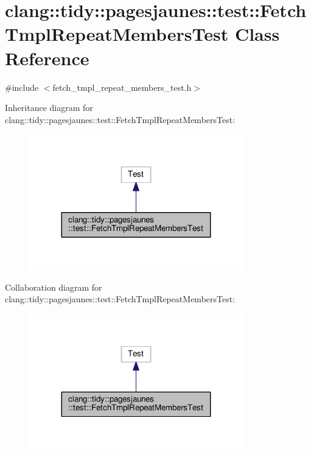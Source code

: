 \hypertarget{classclang_1_1tidy_1_1pagesjaunes_1_1test_1_1_fetch_tmpl_repeat_members_test}{}\section{clang\+:\+:tidy\+:\+:pagesjaunes\+:\+:test\+:\+:Fetch\+Tmpl\+Repeat\+Members\+Test Class Reference}
\label{classclang_1_1tidy_1_1pagesjaunes_1_1test_1_1_fetch_tmpl_repeat_members_test}


{\ttfamily \#include $<$fetch\+\_\+tmpl\+\_\+repeat\+\_\+members\+\_\+test.\+h$>$}



Inheritance diagram for clang\+:\+:tidy\+:\+:pagesjaunes\+:\+:test\+:\+:Fetch\+Tmpl\+Repeat\+Members\+Test\+:
\nopagebreak
\begin{figure}[H]
\begin{center}
\leavevmode
\includegraphics[width=263pt]{classclang_1_1tidy_1_1pagesjaunes_1_1test_1_1_fetch_tmpl_repeat_members_test__inherit__graph}
\end{center}
\end{figure}


Collaboration diagram for clang\+:\+:tidy\+:\+:pagesjaunes\+:\+:test\+:\+:Fetch\+Tmpl\+Repeat\+Members\+Test\+:
\nopagebreak
\begin{figure}[H]
\begin{center}
\leavevmode
\includegraphics[width=263pt]{classclang_1_1tidy_1_1pagesjaunes_1_1test_1_1_fetch_tmpl_repeat_members_test__coll__graph}
\end{center}
\end{figure}
